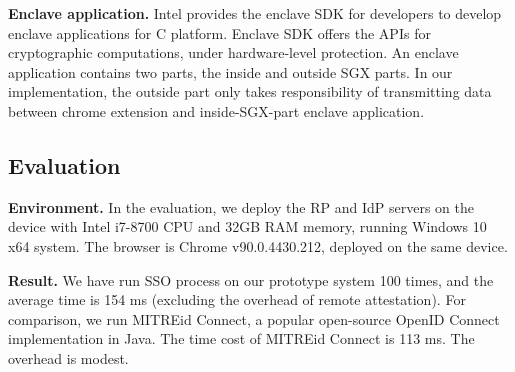 \vspace{3mm}\noindent\textbf{Enclave application.}
Intel provides the enclave SDK for developers to develop enclave applications for C platform. Enclave SDK offers the APIs for cryptographic computations, under hardware-level protection. An enclave application contains two parts, the inside and outside SGX parts. In our implementation, the outside part only takes responsibility of transmitting data between chrome extension and inside-SGX-part enclave application.  

\subsection{Evaluation}
\vspace{3mm}\noindent\textbf{Environment.}
In the evaluation, we deploy the RP and IdP servers on the device with Intel i7-8700 CPU and 32GB RAM memory, running Windows 10 x64 system. The browser is Chrome v90.0.4430.212, deployed on the same device.   



\vspace{3mm}\noindent\textbf{Result.}
We have run SSO process on our prototype system 100 times, and the average time is 154 ms (excluding the overhead of remote attestation). For comparison, we run MITREid Connect, a popular open-source OpenID Connect implementation in Java. The time cost of  MITREid Connect is 113 ms. The overhead is modest.
